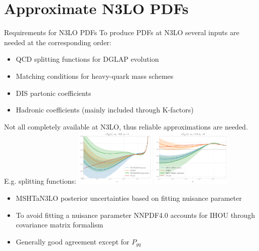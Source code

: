 \documentclass[aspectratio=169, 8pt,t]{beamer}
\begin{document}
\section*{Approximate N3LO PDFs}

\begin{frame}{Requirements for N3LO PDFs}
  To produce PDFs at N3LO several inputs are needed at the corresponding order:
  \begin{itemize}
    \item QCD splitting functions for DGLAP evolution
    \item Matching conditions for heavy-quark mass schemes
    \item DIS partonic coefficients 
    \item Hadronic coefficients (mainly included through K-factors)
  \end{itemize}

  \vspace*{1em}
  Not all completely available at N3LO, thus reliable approximations are needed. E.g. splitting functions:
  \includegraphics[width=0.29\textwidth]{figures/gamma_gg_msht_logx.pdf}
  \includegraphics[width=0.29\textwidth]{figures/gamma_gq_msht_logx.pdf}
  \begin{itemize}
    \item MSHTaN3LO posterior uncertainties based on fitting nuisance parameter
    \item To avoid fitting a nuisance parameter NNPDF4.0 accounts for IHOU through covariance matrix formalism
    \item Generally good agreement except for $P_{gq}$
  \end{itemize}
\end{frame}
\end{document}
